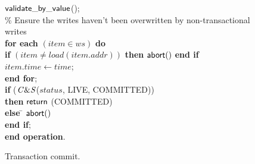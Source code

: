 \documentclass[11pt,letterpaper]{article}
\begin{document}
\begin{figure} [htb]
{{\begin{minipage}[t]{150mm}
\begin{tabbing}
 \> ${\sf validate\_by\_value}$(); \\


\> \% Ensure the writes haven't been overwritten by non-transactional writes \\
 \> 
{\bf for each} $(\mathit{item} \in \mathit{ws})$ {\bf do} \\

 \>\> {\bf if} $(\mathit{item} \neq load(\mathit{item.addr}))$  
                 {\bf then} 
                   ${\sf abort}()$ 
                {\bf end if} \\
 \>\> $\mathit{item.time} \gets \mathit{time}$; \\
 \> {\bf end for}; \\
 \> {\bf if} (${\sf \mathit{C\&S}}$($\mathit{status}$, LIVE, COMMITTED)) \\
 \>\> {\bf then} \> ${\sf return}$ (COMMITTED)\\
 \> \> {\bf else} \= ${\sf abort}()$ \\
 \> {\bf end if};  \\
{\bf end operation}.

\end{tabbing}
\normalsize
\end{minipage}
}
\caption{Transaction commit.}
\label{fig:tbc2}
}
\end{figure}
\end{document}
